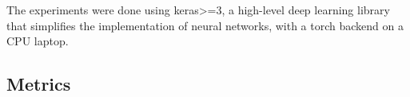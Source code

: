 The experiments were done using keras>=3, a high-level deep learning library that simplifies the implementation of neural networks, with a torch backend on a CPU laptop.








\subsection{Metrics}



